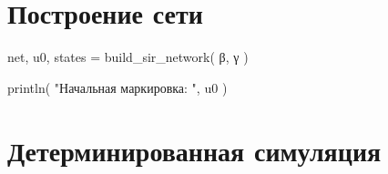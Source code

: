 \documentclass[
  english,
  russian,
  12pt,
  a4paper,
  DIV=11,
  numbers=noendperiod]{scrreprt}
\newenvironment{Shaded}{\begin{snugshade}}{\end{snugshade}}
\newcommand{\FunctionTok}[1]{\textcolor[rgb]{0.28,0.35,0.67}{#1}}
\newcommand{\NormalTok}[1]{\textcolor[rgb]{0.00,0.23,0.31}{#1}}
\newcommand{\OperatorTok}[1]{\textcolor[rgb]{0.37,0.37,0.37}{#1}}
\newcommand{\StringTok}[1]{\textcolor[rgb]{0.13,0.47,0.30}{#1}}
\begin{document}
\section{Построение
сети}\label{ux43fux43eux441ux442ux440ux43eux435ux43dux438ux435-ux441ux435ux442ux438}

\begin{Shaded}
\begin{Highlighting}[]
\NormalTok{net,}
\NormalTok{u0,}
\NormalTok{states }\OperatorTok{=}
    \FunctionTok{build\_sir\_network}\NormalTok{(}
\NormalTok{        β,}
\NormalTok{        γ}
\NormalTok{    )}

\FunctionTok{println}\NormalTok{(}
    \StringTok{"Начальная маркировка: "}\NormalTok{,}
\NormalTok{    u0}
\NormalTok{)}
\end{Highlighting}
\end{Shaded}

\section{Детерминированная
симуляция}\label{ux434ux435ux442ux435ux440ux43cux438ux43dux438ux440ux43eux432ux430ux43dux43dux430ux44f-ux441ux438ux43cux443ux43bux44fux446ux438ux44f}
\end{document}
